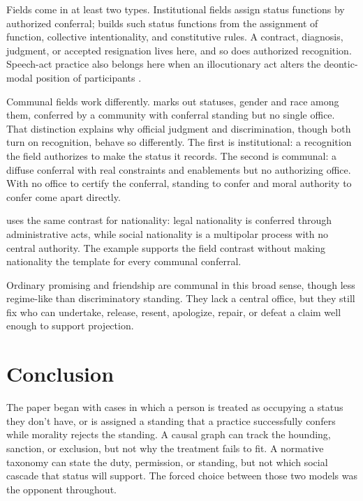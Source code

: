 \documentclass[12pt]{article}
\begin{document}
Fields come in at least two types. Institutional fields assign status functions by authorized conferral; \textcite{searle1995Construction} builds such status functions from the assignment of function, collective intentionality, and constitutive rules. A contract, diagnosis, judgment, or accepted resignation lives here, and so does authorized recognition. Speech-act practice also belongs here when an illocutionary act alters the deontic-modal position of participants \citep{sbisa2023OnIllocutionaryTypes}.

Communal fields work differently. \textcite{asta2018Categories} marks out statuses, gender and race among them, conferred by a community with conferral standing but no single office. That distinction explains why official judgment and discrimination, though both turn on recognition, behave so differently. The first is institutional: a recognition the field authorizes to make the status it records. The second is communal: a diffuse conferral with real constraints and enablements but no authorizing office. With no office to certify the conferral, standing to confer and moral authority to confer come apart directly.

\textcite[pp.~42--43]{behrensen2018MakingUpPeoples} uses the same contrast for nationality: legal nationality is conferred through administrative acts, while social nationality is a multipolar process with no central authority. The example supports the field contrast without making nationality the template for every communal conferral.

Ordinary promising and friendship are communal in this broad sense, though less regime-like than discriminatory standing. They lack a central office, but they still fix who can undertake, release, resent, apologize, repair, or defeat a claim well enough to support projection.

\section{Conclusion}
\label{sec:conclusion}

The paper began with cases in which a person is treated as occupying a status they don't have, or is assigned a standing that a practice successfully confers while morality rejects the standing. A causal graph can track the hounding, sanction, or exclusion, but not why the treatment fails to fit. A normative taxonomy can state the duty, permission, or standing, but not which social cascade that status will support. The forced choice between those two models was the opponent throughout.
\end{document}
